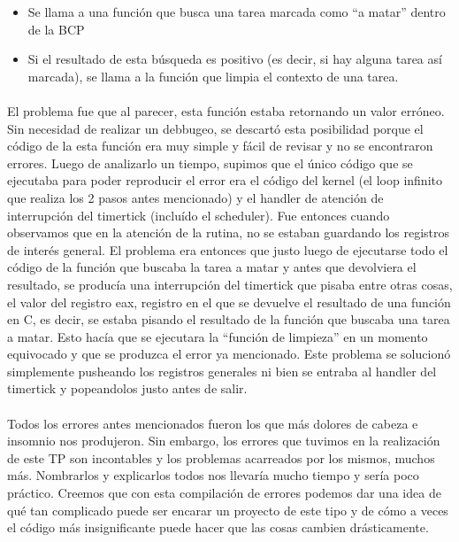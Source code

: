\documentclass[11pt, a4paper]{article}
\begin{document}
\begin{itemize}
	\item Se llama a una función que busca una tarea marcada como ``a matar'' dentro de la BCP
	\item Si el resultado de esta búsqueda es positivo (es decir, si hay alguna tarea así marcada), se llama a la función que limpia el contexto de una tarea.
\end{itemize}

\paragraph{}
El problema fue que al parecer, esta función estaba retornando un valor erróneo. Sin necesidad de realizar un debbugeo, se descartó esta posibilidad porque el código de la esta función era muy simple y fácil de revisar y no se encontraron errores. Luego de analizarlo un tiempo, supimos que el único código que se ejecutaba para poder reproducir el error era el código del kernel (el loop infinito que realiza los 2 pasos antes mencionado) y el handler de atención de interrupción del timertick (incluído el scheduler). Fue entonces cuando observamos que en la atención de la rutina, no se estaban guardando los registros de interés general. El problema era entonces que justo luego de ejecutarse todo el código de la función que buscaba la tarea a matar y antes que devolviera el resultado, se producía una interrupción del timertick que pisaba entre otras cosas, el valor del registro eax, registro en el que se devuelve el resultado de una función en C, es decir, se estaba pisando el resultado de la función que buscaba una tarea a matar. Esto hacía que se ejecutara la ``función de limpieza'' en un momento equivocado y que se produzca el error ya mencionado. Este problema se solucionó simplemente pusheando los registros generales ni bien se entraba al handler del timertick y popeandolos justo antes de salir.

\paragraph{}
Todos los errores antes mencionados fueron los que más dolores de cabeza e insomnio nos produjeron. Sin embargo, los errores que tuvimos en la realización de este TP son incontables y los problemas acarreados por los mismos, muchos más. Nombrarlos y explicarlos todos nos llevaría mucho tiempo y sería poco práctico. Creemos que con esta compilación de errores podemos dar una idea de qué tan complicado puede ser encarar un proyecto de este tipo y de cómo a veces el código más insignificante puede hacer que las cosas cambien drásticamente.
\end{document}
